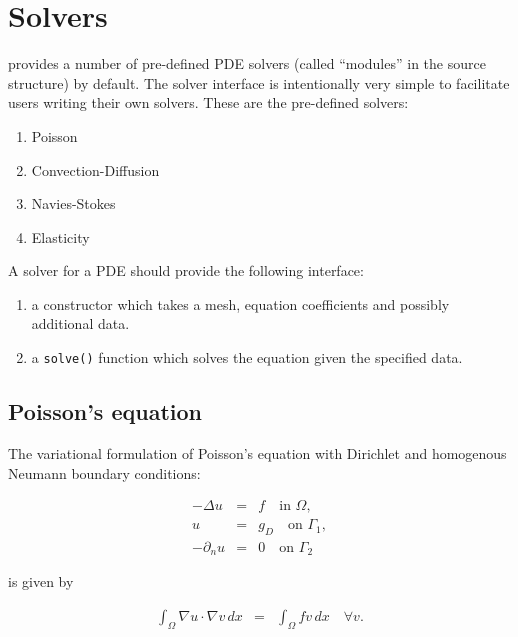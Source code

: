 \chapter{Solvers}

\dolfin{} provides a number of pre-defined PDE solvers (called
``modules'' in the source structure) by default. The solver interface
is intentionally very simple to facilitate users writing their own
solvers. These are the pre-defined solvers:

\begin{enumerate}
\item
Poisson
\item
Convection-Diffusion
\item
Navies-Stokes
\item
Elasticity
\end{enumerate}

A solver for a PDE should provide the following interface:

\begin{enumerate}
\item
a constructor which takes a mesh, equation coefficients and possibly
additional data.
\item
a \texttt{solve()} function which solves the equation given the
specified data.
\end{enumerate}



\section{Poisson's equation}

The variational formulation of Poisson's equation with Dirichlet and
homogenous Neumann boundary conditions:

\begin{equation} \label{eq:poisson}
  \begin{array}{rcl}
    - \Delta u &=& f \quad \mbox{in } \Omega, \\
    u &=& g_D \quad \mbox{on } \Gamma_1, \\
    - \partial_n u &=& 0 \quad \mbox{on } \Gamma_2
  \end{array}
\end{equation}

is given by

\begin{equation} \label{eq:poisson-varform}
\begin{array}{rcl}
  \int_{\Omega} \nabla u \cdot \nabla v \, dx &=&
  \int_{\Omega} fv \, dx 
  \quad \forall v.
\end{array}
\end{equation}


